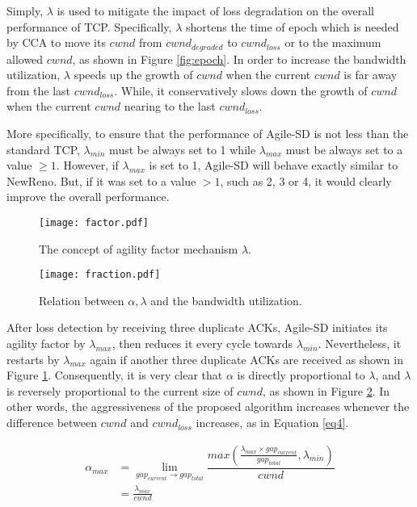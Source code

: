 \documentclass[preprint,3p,times,twocolumn,authoryear]{elsarticle}
\begin{document}
Simply, $\lambda$ is used to mitigate the impact of loss degradation on the overall performance of TCP. Specifically, $\lambda$ shortens the time of epoch which is needed by CCA to move its $cwnd$ from $cwnd_{degraded}$ to $cwnd_{loss}$ or to the maximum allowed $cwnd$, as shown in Figure \ref{fig:epoch}. In order to increase the bandwidth utilization, $\lambda$ speeds up the growth of $cwnd$ when the current $cwnd$ is far away from the last $cwnd_{loss}$. While, it conservatively slows down the growth of $cwnd$ when the current $cwnd$ nearing to the last $cwnd_{loss}$.

More specifically, to ensure that the performance of Agile-SD is not less than the standard TCP, $\lambda_{min}$ must be always set to 1 while $\lambda_{max}$ must be always set to a value $\geq 1$. However, if $\lambda_{max}$ is set to 1, Agile-SD will behave exactly similar to NewReno. But, if it was set to a value $> 1$, such as 2, 3 or 4, it would clearly improve the overall performance. 

\begin{figure} [t]
\centering
\texttt{[image: factor.pdf]}
\caption{The concept of agility factor mechanism $\lambda$.}
\label{fig:factor}
\end{figure}

\begin{figure} [t]
\centering
\texttt{[image: fraction.pdf]}
\caption{Relation between $\alpha, \lambda$ and the bandwidth utilization.}
\label{fig:fraction}
\end{figure}


After loss detection by receiving three duplicate ACKs, Agile-SD initiates its agility factor by $\lambda_{max}$, then reduces it every cycle towards $\lambda_{min}$. Nevertheless, it restarts by $\lambda_{max}$ again if another three duplicate ACKs are received as shown in Figure \ref{fig:factor}. Consequently, it is very clear that $\alpha$ is directly proportional to $\lambda$, and $\lambda$ is reversely proportional to the current size of $cwnd$, as shown in Figure \ref{fig:fraction}. In other words, the aggressiveness of the proposed algorithm increases whenever the difference between $cwnd$ and $cwnd_{loss}$ increases, as in Equation \eqref{eq4}. 

\begin{align}
\alpha_{max} &= \lim_{gap_{current} \to gap_{total}}  \dfrac{max\left( \frac{\lambda_{max} \times gap_{current}}{gap_{total}}, \lambda_{min}\right)} {cwnd}\label{eq4}\\
&= \frac{\lambda_{max}}{cwnd} \nonumber
\end{align}
\end{document}
